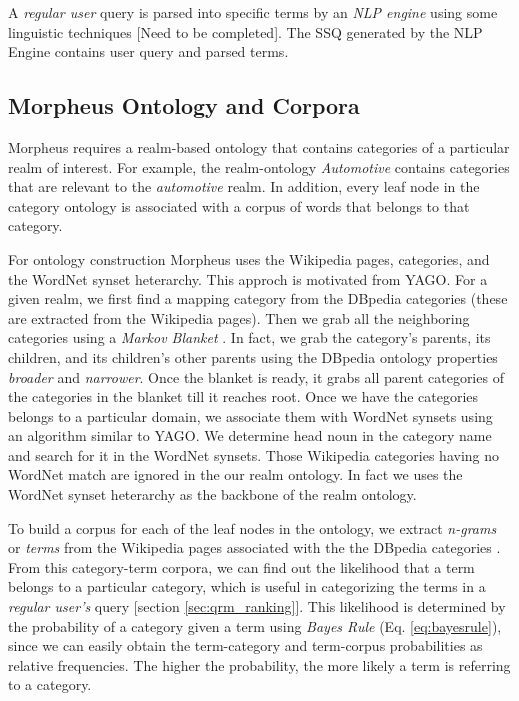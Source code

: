 A \textit{regular user} query is parsed into specific terms by an \textit{NLP
engine} using some linguistic techniques [Need to be completed]. The SSQ generated by the NLP
Engine contains user query and parsed terms. 


\subsection{Morpheus Ontology and Corpora} 
\label{sec:ontology_corpora}

Morpheus requires a realm-based ontology that contains categories of a
particular realm of interest. For example, the realm-ontology \textit{Automotive}
contains categories that are relevant to the \textit{automotive} realm. In
addition, every leaf node in the category ontology is associated with a corpus of words
that belongs to that category. 

For ontology construction Morpheus uses the Wikipedia pages, categories,
and the WordNet synset heterarchy. This approch is motivated from
YAGO\cite{Suchanek2009phd}. For a given realm, we first find a mapping category 
from the DBpedia categories\cite{Auer07dbpedia:a} (these are extracted from 
the Wikipedia pages). Then we grab all the neighboring categories
using a \textit{Markov Blanket} \cite{PRIS}. In fact, we grab 
the category's parents, its children, and its 
children's other parents using the DBpedia ontology properties \textit{broader}
and \textit{narrower}. Once the blanket is ready, it grabs all parent categories
of the categories in the blanket till it reaches root. Once we have the
categories belongs to a particular domain, we associate them with WordNet synsets
using an algorithm similar to YAGO\cite{Suchanek2009phd}. We determine head noun in the
category name and search for it in the WordNet synsets.
Those Wikipedia categories having no WordNet match are ignored in the our realm
ontology. In fact we uses the WordNet synset heterarchy as the backbone of the   
realm ontology. 

To build a corpus for each of the leaf nodes in the ontology, 
we extract \emph{n-grams} or \emph{terms} from the Wikipedia pages associated with the 
the DBpedia categories \cite{Auer07dbpedia:a}. From this category-term corpora, 
we can find out the likelihood that a term belongs to a particular category, 
which is useful in categorizing the terms in a \emph{regular user's} query [section \ref{sec:qrm_ranking}].    
This likelihood is determined by the probability of a category given a term 
using \textit{Bayes Rule} (Eq. \ref{eq:bayesrule}), since we can 
easily obtain the term-category and term-corpus probabilities as 
relative frequencies. The higher the probability, the more likely a 
term is referring to a category. 

